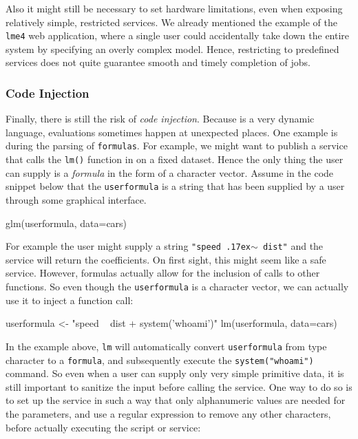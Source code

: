 \documentclass[article]{jss}
\begin{document}
Also it might still be necessary to set hardware limitations, even when exposing
relatively simple, restricted services. We already mentioned the example of the
\texttt{lme4} web application, where a single user could accidentally take down
the entire system by specifying an overly complex model. Hence, restricting to
predefined services does not quite guarantee smooth and timely completion of
 jobs.

\subsubsection{Code Injection}

Finally, there is still the risk of \emph{code injection}. Because 
is a very dynamic language, evaluations sometimes happen at unexpected places.
One example is during the parsing of \texttt{formulas}. For example, we might
want to publish a service that calls the \texttt{lm()} function in 
on a fixed dataset. Hence the only thing the user can supply is a \emph{formula}
in the form of a character vector. Assume in the code snippet below that
the \texttt{userformula} is a string that has been supplied by a user through
some graphical interface.

\begin{CodeChunk}
\begin{CodeInput}
glm(userformula, data=cars)
\end{CodeInput}
\end{CodeChunk}

For example the user might supply a string \texttt{"speed
{\raise.17ex\hbox{$\scriptstyle\sim$}} dist"} and the service will return the
coefficients. On first sight, this might seem like a safe service. However,
formulas actually allow for the inclusion of calls to other functions. So even though the \texttt{userformula} is a character vector, we can actually use it to inject a
function call:

\begin{CodeChunk}
\begin{CodeInput}
userformula <- "speed ~ dist + system('whoami')"
lm(userformula, data=cars)
\end{CodeInput}
\end{CodeChunk}

In the example above, \texttt{lm} will automatically convert
\texttt{userformula} from type character to a \texttt{formula}, and
subsequently execute the \texttt{system("whoami")} command. So even when a user
can supply only very simple primitive data, it is still important to sanitize
the input before calling the service. One way to do so is to set up the service
in such a way that only alphanumeric values are needed for the parameters, and
use a regular expression to remove any other characters, before actually
executing the script or service:
\end{document}
